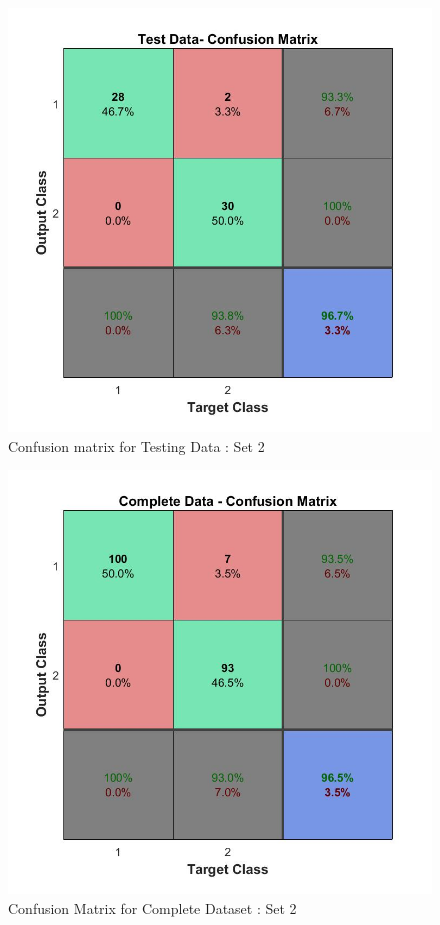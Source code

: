 \documentclass[10pt, letterpaper]{article}
\begin{document}
\begin{enumerate}
\begin{figure}[h!]
\centering
\includegraphics[scale=0.5]{TestingData_Confusion-2.jpg}
\caption{Confusion matrix for Testing Data : Set 2}
\label{Fig:ConfTesting2}
\end{figure} 


\begin{figure}[h!]
\centering
\includegraphics[scale=0.5]{CompleteDataset_Confusion-2Second.jpg}
\caption{Confusion Matrix for Complete Dataset : Set 2}
\label{Fig:ConfCompleteData2}
\end{figure} 


\end{enumerate}
\end{document}
